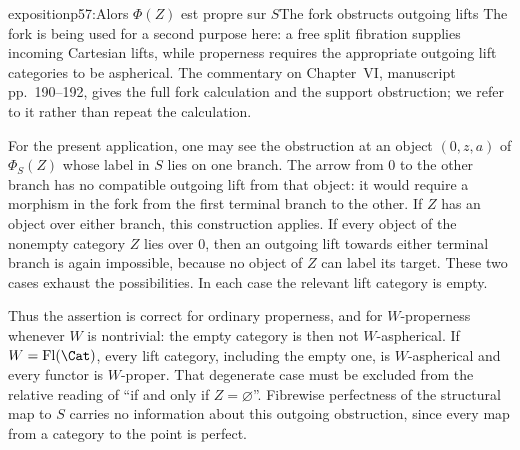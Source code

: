 \begin{dcomment}{exposition}{p57:Alors $\Phi(Z)$ est propre sur $S$}{The fork obstructs outgoing lifts}
The fork is being used for a second purpose here: a free split fibration supplies incoming Cartesian lifts, while properness requires the appropriate outgoing lift categories to be aspherical. The commentary on Chapter~VI, manuscript pp.~190--192, gives the full fork calculation and the support obstruction; we refer to it rather than repeat the calculation.

For the present application, one may see the obstruction at an object $(0,z,a)$ of $\Phi_S(Z)$ whose label in $S$ lies on one branch. The arrow from $0$ to the other branch has no compatible outgoing lift from that object: it would require a morphism in the fork from the first terminal branch to the other. If $Z$ has an object over either branch, this construction applies. If every object of the nonempty category $Z$ lies over $0$, then an outgoing lift towards either terminal branch is again impossible, because no object of $Z$ can label its target. These two cases exhaust the possibilities. In each case the relevant lift category is empty.

Thus the assertion is correct for ordinary properness, and for $W$-properness whenever $W$ is nontrivial: the empty category is then not $W$-aspherical. If $W=\operatorname{Fl}(\Cat)$, every lift category, including the empty one, is $W$-aspherical and every functor is $W$-proper. That degenerate case must be excluded from the relative reading of ``if and only if $Z=\varnothing$''. Fibrewise perfectness of the structural map to $S$ carries no information about this outgoing obstruction, since every map from a category to the point is perfect.
\end{dcomment}

